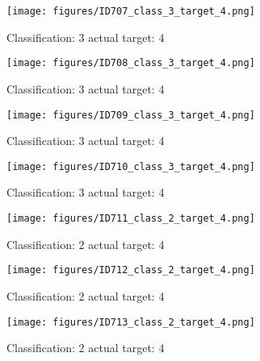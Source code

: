 \begin{figure}[h!]
\begin{center}
\texttt{[image: figures/ID707\_class\_3\_target\_4.png]}
\end{center}
\caption{ Classification: 3 actual target: 4}
\label{fig:ID707_class_3_target_4}
\end{figure}
\begin{figure}[h!]
\begin{center}
\texttt{[image: figures/ID708\_class\_3\_target\_4.png]}
\end{center}
\caption{ Classification: 3 actual target: 4}
\label{fig:ID708_class_3_target_4}
\end{figure}
\begin{figure}[h!]
\begin{center}
\texttt{[image: figures/ID709\_class\_3\_target\_4.png]}
\end{center}
\caption{ Classification: 3 actual target: 4}
\label{fig:ID709_class_3_target_4}
\end{figure}
\begin{figure}[h!]
\begin{center}
\texttt{[image: figures/ID710\_class\_3\_target\_4.png]}
\end{center}
\caption{ Classification: 3 actual target: 4}
\label{fig:ID710_class_3_target_4}
\end{figure}
\begin{figure}[h!]
\begin{center}
\texttt{[image: figures/ID711\_class\_2\_target\_4.png]}
\end{center}
\caption{ Classification: 2 actual target: 4}
\label{fig:ID711_class_2_target_4}
\end{figure}
\begin{figure}[h!]
\begin{center}
\texttt{[image: figures/ID712\_class\_2\_target\_4.png]}
\end{center}
\caption{ Classification: 2 actual target: 4}
\label{fig:ID712_class_2_target_4}
\end{figure}
\begin{figure}[h!]
\begin{center}
\texttt{[image: figures/ID713\_class\_2\_target\_4.png]}
\end{center}
\caption{ Classification: 2 actual target: 4}
\label{fig:ID713_class_2_target_4}
\end{figure}
